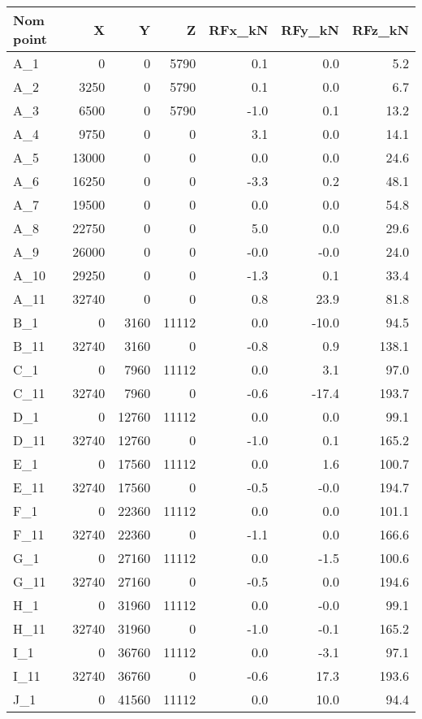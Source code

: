 \begin{tabular}{lrrrrrr}
\toprule
Nom point & X & Y & Z & RFx\_kN & RFy\_kN & RFz\_kN \\
\midrule
A\_1 & 0 & 0 & 5790 & 0.1 & 0.0 & 5.2 \\
A\_2 & 3250 & 0 & 5790 & 0.1 & 0.0 & 6.7 \\
A\_3 & 6500 & 0 & 5790 & -1.0 & 0.1 & 13.2 \\
A\_4 & 9750 & 0 & 0 & 3.1 & 0.0 & 14.1 \\
A\_5 & 13000 & 0 & 0 & 0.0 & 0.0 & 24.6 \\
A\_6 & 16250 & 0 & 0 & -3.3 & 0.2 & 48.1 \\
A\_7 & 19500 & 0 & 0 & 0.0 & 0.0 & 54.8 \\
A\_8 & 22750 & 0 & 0 & 5.0 & 0.0 & 29.6 \\
A\_9 & 26000 & 0 & 0 & -0.0 & -0.0 & 24.0 \\
A\_10 & 29250 & 0 & 0 & -1.3 & 0.1 & 33.4 \\
A\_11 & 32740 & 0 & 0 & 0.8 & 23.9 & 81.8 \\
B\_1 & 0 & 3160 & 11112 & 0.0 & -10.0 & 94.5 \\
B\_11 & 32740 & 3160 & 0 & -0.8 & 0.9 & 138.1 \\
C\_1 & 0 & 7960 & 11112 & 0.0 & 3.1 & 97.0 \\
C\_11 & 32740 & 7960 & 0 & -0.6 & -17.4 & 193.7 \\
D\_1 & 0 & 12760 & 11112 & 0.0 & 0.0 & 99.1 \\
D\_11 & 32740 & 12760 & 0 & -1.0 & 0.1 & 165.2 \\
E\_1 & 0 & 17560 & 11112 & 0.0 & 1.6 & 100.7 \\
E\_11 & 32740 & 17560 & 0 & -0.5 & -0.0 & 194.7 \\
F\_1 & 0 & 22360 & 11112 & 0.0 & 0.0 & 101.1 \\
F\_11 & 32740 & 22360 & 0 & -1.1 & 0.0 & 166.6 \\
G\_1 & 0 & 27160 & 11112 & 0.0 & -1.5 & 100.6 \\
G\_11 & 32740 & 27160 & 0 & -0.5 & 0.0 & 194.6 \\
H\_1 & 0 & 31960 & 11112 & 0.0 & -0.0 & 99.1 \\
H\_11 & 32740 & 31960 & 0 & -1.0 & -0.1 & 165.2 \\
I\_1 & 0 & 36760 & 11112 & 0.0 & -3.1 & 97.1 \\
I\_11 & 32740 & 36760 & 0 & -0.6 & 17.3 & 193.6 \\
J\_1 & 0 & 41560 & 11112 & 0.0 & 10.0 & 94.4 \\

\end{tabular}
